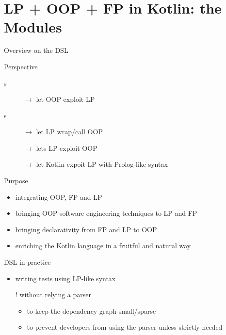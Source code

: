 \documentclass[handout]{beamer}
\begin{document}

\section{LP + OOP + FP in Kotlin: the  Modules}

\begin{frame}[allowframebreaks]{Overview on the DSL}

    \begin{block}{Perspective}
        \begin{description}
            \item[s] $\rightarrow$ let OOP exploit LP
            \item[s] $\rightarrow$ let LP wrap/call OOP 
            \item[] $\rightarrow$ lets LP exploit OOP
            \item[] $\rightarrow$ \alert{let Kotlin expoit LP with Prolog-like syntax}
        \end{description}
    \end{block}

    \framebreak

    \begin{block}{Purpose}
        \begin{itemize}
            \item integrating OOP, FP and LP
            \item bringing OOP software engineering techniques to LP and FP
            \item bringing declarativity from FP and LP to OOP
            \item enriching the Kotlin language in a fruitful and natural way
        \end{itemize}
    \end{block}

    \framebreak

    \begin{exampleblock}{DSL in practice}
        \begin{itemize}
            \item writing tests using LP-like syntax
            \item[!] \alert{without} relying a parser
            \begin{itemize}
                \item to keep the dependency graph small/sparse
                \item to prevent developers from using the parser unless strictly needed
            \end{itemize}
        \end{itemize}
    \end{exampleblock}


\end{frame}
\end{document}
